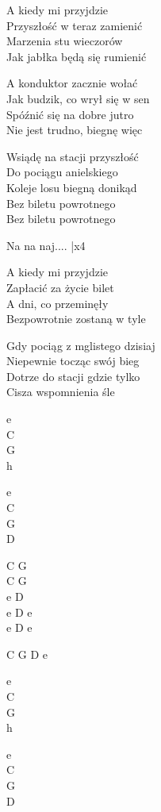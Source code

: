 \begin{text}
    A kiedy mi przyjdzie\\
    Przyszłość w teraz zamienić\\
    Marzenia stu wieczorów\\
    Jak jabłka będą się rumienić

    A konduktor zacznie wołać\\
    Jak budzik, co wrył się w sen\\
    Spóźnić się na dobre jutro\\
    Nie jest trudno, biegnę więc	

    \vin Wsiądę na stacji przyszłość\\
    \vin Do pociągu anielskiego\\
    \vin Koleje losu biegną donikąd\\
    \vin Bez biletu powrotnego\\
    \vin Bez biletu powrotnego	

    \vin Na na naj.... |x4	

    A kiedy mi przyjdzie\\
    Zapłacić za życie bilet\\
    A dni, co przeminęły\\
    Bezpowrotnie zostaną w tyle

    Gdy pociąg z mglistego dzisiaj\\
    Niepewnie tocząc swój bieg\\
    Dotrze do stacji gdzie tylko\\
    Cisza wspomnienia śle

\end{text}
\begin{chord}
    e\\
    C\\
    G\\
    h

    e\\
    C\\
    G\\
    D

    C G\\
    C G\\
    e D\\
    e D e\\
    e D e

    C G D e

    e\\
    C\\
    G\\
    h

    e\\
    C\\
    G\\
    D


\end{chord}